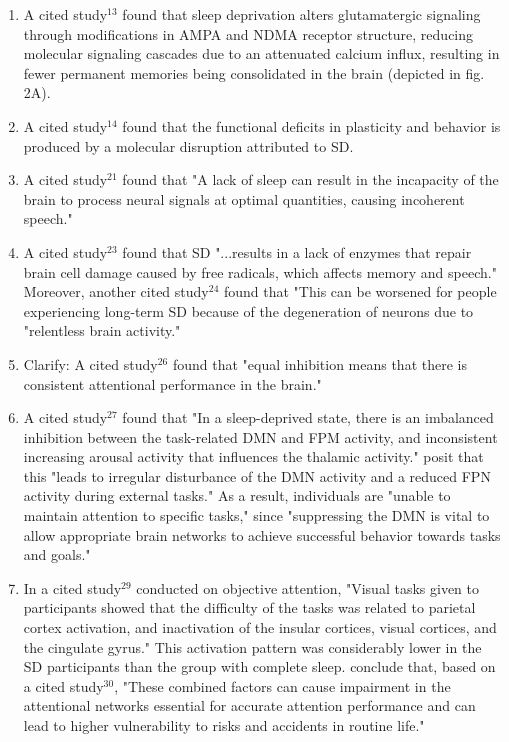 \begin{enumerate}
	\item A cited study$^{13}$ found that sleep deprivation alters glutamatergic signaling through modifications in AMPA and NDMA receptor structure, reducing molecular signaling cascades due to an attenuated calcium influx, resulting in fewer permanent memories being consolidated in the brain (depicted in fig. 2A).

	\item A cited study$^{14}$ found that the functional deficits in plasticity and behavior is produced by a molecular disruption attributed to SD.

	\item A cited study$^{21}$ found that "A lack of sleep can result in the incapacity of the brain to process neural signals at optimal quantities, causing incoherent speech."

	\item A cited study$^{23}$ found that SD "...results in a lack of enzymes that repair brain cell damage caused by free radicals, which affects memory and speech." Moreover, another cited study$^{24}$ found that "This can be worsened for people experiencing long-term SD because of the degeneration of neurons due to "relentless brain activity."

	\item Clarify: A cited study$^{26}$ found that "equal inhibition means that there is consistent attentional performance in the brain."

	\item A cited study$^{27}$ found that "In a sleep-deprived state, there is an imbalanced inhibition between the task-related DMN and FPM activity, and inconsistent increasing arousal activity that influences the thalamic activity." \citeauthor{1} posit that this "leads to irregular disturbance of the DMN activity and a reduced FPN activity during external tasks." As a result, individuals are "unable to maintain attention to specific tasks," since "suppressing the DMN is vital to allow appropriate brain networks to achieve successful behavior towards tasks and goals."

	\item In a cited study$^{29}$ conducted on objective attention, "Visual tasks given to participants showed that the difficulty of the tasks was related to parietal cortex activation, and inactivation of the insular cortices, visual cortices, and the cingulate gyrus." This activation pattern was considerably lower in the SD participants than the group with complete sleep. \citeauthor{1} conclude that, based on a cited study$^{30}$, "These combined factors can cause impairment in the attentional networks essential for accurate attention performance and can lead to higher vulnerability to risks and accidents in routine life."


\end{enumerate}
